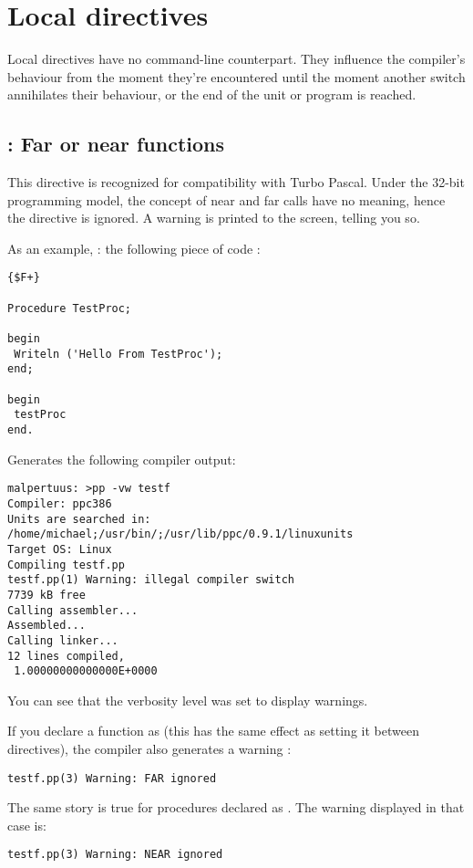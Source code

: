 \documentclass{report}
\begin{document}
\section{Local directives}
\label{se:LocalSwitch}
Local directives have no command-line counterpart. They influence the
compiler's behaviour from the moment they're encountered until the moment
another switch annihilates their behaviour, or the end of the unit or
program is reached.

\subsection{ : Far or near functions}
This directive is recognized for compatibility with Turbo Pascal. Under the
32-bit programming model, the concept of near and far calls have no meaning,
hence the directive is ignored. A warning is printed to the screen, telling
you so.

As an example, : the following piece of code :
\begin{verbatim}
{$F+}

Procedure TestProc;

begin
 Writeln ('Hello From TestProc');
end;

begin
 testProc
end.
\end{verbatim}
Generates the following compiler output:
\begin{verbatim}
malpertuus: >pp -vw testf
Compiler: ppc386
Units are searched in: /home/michael;/usr/bin/;/usr/lib/ppc/0.9.1/linuxunits
Target OS: Linux
Compiling testf.pp
testf.pp(1) Warning: illegal compiler switch
7739 kB free
Calling assembler...
Assembled...
Calling linker...
12 lines compiled,
 1.00000000000000E+0000
\end{verbatim}
You can see that the verbosity level was set to display warnings.

If you declare a function as  (this has the same effect as setting it
between  directives), the compiler also generates a
warning :
\begin{verbatim}
testf.pp(3) Warning: FAR ignored
\end{verbatim}

The same story is true for procedures declared as . The warning
displayed in that case is:
\begin{verbatim}
testf.pp(3) Warning: NEAR ignored
\end{verbatim}
\end{document}
